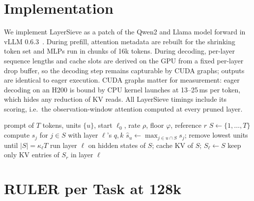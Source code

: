 \documentclass[10pt,conference]{IEEEtran}
\begin{document}
\section{Implementation}
\label{app:impl}

We implement LayerSieve as a patch of the Qwen2 and Llama model forward in vLLM 0.6.3~\cite{kwon2023efficient}. During prefill, attention metadata are rebuilt for the shrinking token set and MLPs run in chunks of 16k tokens. During decoding, per-layer sequence lengths and cache slots are derived on the GPU from a fixed per-layer drop buffer, so the decoding step remains capturable by CUDA graphs; outputs are identical to eager execution. CUDA graphs matter for measurement: eager decoding on an H200 is bound by CPU kernel launches at 13--25\,ms per token, which hides any reduction of KV reads. All LayerSieve timings include its scoring, i.e.\ the observation-window attention computed at every pruned layer.

\begin{algorithm}[h]
\caption{LayerSieve prefill for one request}
\label{alg:layersieve}
\begin{algorithmic}[1]
\Require prompt of $T$ tokens, units $\{u\}$, start $\ell_0$, rate $\rho$, floor $\varphi$, reference $r$
\State $S\gets\{1,\dots,T\}$
     \State compute $s_j$ for $j\in S$ with layer $\ell$'s $q,k$ 
     \State $\hat s_u\gets\max_{j\in u\cap S}s_j$; remove lowest units until $|S|=\kappa_\ell T$ 
  \EndIf
  \State run layer $\ell$ on hidden states of $S$; cache KV of $S$; $S_\ell\gets S$
\EndFor
{} \State keep only KV entries of $S_r$ in layer $\ell$
\EndFor
\end{algorithmic}
\end{algorithm}

\section{RULER per Task at 128k}
\label{app:ruler}
\end{document}
